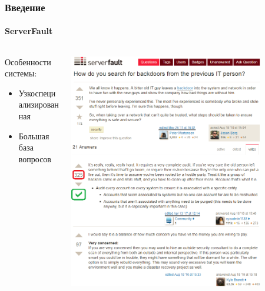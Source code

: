 \documentclass[10pt]{beamer}
\begin{document}

\begin{frame}
\frametitle{Введение}
\framesubtitle{ServerFault}

\begin{columns}
    \begin{column}{0.4\textwidth}
    	Особенности системы:
    	\begin{itemize}
			\item Узкоспециализированная
			\item Большая база вопросов
    	\end{itemize}
    \end{column}
    \begin{column}{0.6\textwidth}
        \begin{center}
            \includegraphics[width=0.82\textwidth]{images/serverfault_screen.png}
        \end{center}
    \end{column}
\end{columns}

\end{frame}

\end{document}
